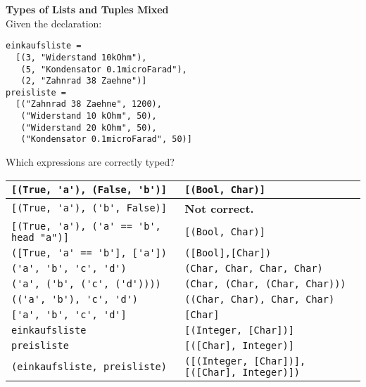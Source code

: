 \textbf{Types of Lists and Tuples Mixed}\\
Given the declaration:
\begin{lstlisting}
einkaufsliste =
  [(3, "Widerstand 10kOhm"),
   (5, "Kondensator 0.1microFarad"),
   (2, "Zahnrad 38 Zaehne")]
preisliste =
  [("Zahnrad 38 Zaehne", 1200),
   ("Widerstand 10 kOhm", 50),
   ("Widerstand 20 kOhm", 50),
   ("Kondensator 0.1microFarad", 50)]
\end{lstlisting}
Which expressions are correctly typed?\\
\begin{tabularx}{\linewidth}{|X|X|}
  \hline
  \lstinline|[(True, 'a'), (False, 'b')]| & \lstinline|[(Bool, Char)]|\\
  \hline
  \lstinline|[(True, 'a'), ('b', False)]| & \textbf{Not correct.}\\
  \hline
  \lstinline|[(True, 'a'), ('a' == 'b', head "a")]| & \lstinline|[(Bool, Char)]|\\
  \hline
  \lstinline|([True, 'a' == 'b'], ['a'])| & \lstinline|([Bool],[Char])|\\
  \hline
  \lstinline|('a', 'b', 'c', 'd')| & \lstinline|(Char, Char, Char, Char)|\\
  \hline
  \lstinline|('a', ('b', ('c', ('d'))))| & \lstinline|(Char, (Char, (Char, Char)))|\\
  \hline
  \lstinline|(('a', 'b'), 'c', 'd')| & \lstinline|((Char, Char), Char, Char)|\\
  \hline
  \lstinline|['a', 'b', 'c', 'd']| & \lstinline|[Char]|\\
  \hline
  \lstinline|einkaufsliste| & \lstinline|[(Integer, [Char])]|\\
  \hline
  \lstinline|preisliste| & \lstinline|[([Char], Integer)]|\\
  \hline
  \lstinline|(einkaufsliste, preisliste)| & \lstinline|([(Integer, [Char])], [([Char], Integer)])|\\
  \hline
\end{tabularx}

